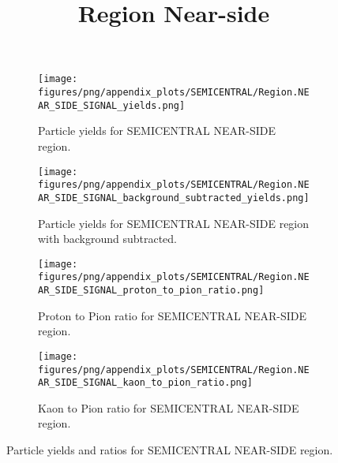                 \begin{figure}[H]
                    \title{Region Near-side}
                    \begin{subfigure}[b]{0.5\textwidth}
                        \centering
                        \texttt{[image: figures/png/appendix\_plots/SEMICENTRAL/Region.NEAR\_SIDE\_SIGNAL\_yields.png]}
                        \caption{Particle yields for SEMICENTRAL NEAR-SIDE region.}
                        \label{fig:appendix_SEMICENTRAL_NEAR_SIDE_SIGNAL_Inclusive_Yields}
                    \end{subfigure}
                    \begin{subfigure}[b]{0.5\textwidth}
                        \centering
                        \texttt{[image: figures/png/appendix\_plots/SEMICENTRAL/Region.NEAR\_SIDE\_SIGNAL\_background\_subtracted\_yields.png]}
                        \caption{Particle yields for SEMICENTRAL NEAR-SIDE region with background subtracted.}
                        \label{fig:appendix_SEMICENTRAL_NEAR_SIDE_SIGNAL_Inclusive_Yields_Background_Subtracted}
                    \end{subfigure}
                    \begin{subfigure}[b]{0.5\textwidth}
                        \centering
                        \texttt{[image: figures/png/appendix\_plots/SEMICENTRAL/Region.NEAR\_SIDE\_SIGNAL\_proton\_to\_pion\_ratio.png]}
                        \caption{Proton to Pion ratio for SEMICENTRAL NEAR-SIDE region.}
                        \label{fig:appendix_SEMICENTRAL_NEAR_SIDE_SIGNAL_Proton_to_Pion_Ratio}
                    \end{subfigure}
                    \begin{subfigure}[b]{0.5\textwidth}
                        \centering
                        \texttt{[image: figures/png/appendix\_plots/SEMICENTRAL/Region.NEAR\_SIDE\_SIGNAL\_kaon\_to\_pion\_ratio.png]}
                        \caption{Kaon to Pion ratio for SEMICENTRAL NEAR-SIDE region.}
                        \label{fig:appendix_SEMICENTRAL_NEAR_SIDE_SIGNAL_Kaon_to_Pion_Ratio}
                    \end{subfigure}
                    \caption{Particle yields and ratios for SEMICENTRAL NEAR-SIDE region.}
                    \label{fig:appendix_SEMICENTRAL_NEAR_SIDE_SIGNAL_Inclusive_Yields_and_Ratios}
                \end{figure}
